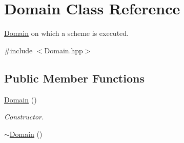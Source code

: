 \hypertarget{classDomain}{
\section{Domain Class Reference}
\label{classDomain}
}


\hyperlink{classDomain}{Domain} on which a scheme is executed.  


{\ttfamily \#include $<$Domain.hpp$>$}\subsection*{Public Member Functions}
\begin{DoxyCompactItemize}
\item 
\hypertarget{classDomain_a6adccae537e53d4fde2b70f875e6b8d0}{
\hyperlink{classDomain_a6adccae537e53d4fde2b70f875e6b8d0}{Domain} ()}
\label{classDomain_a6adccae537e53d4fde2b70f875e6b8d0}

\begin{DoxyCompactList}\small\item\em Constructor. \item\end{DoxyCompactList}\item 
\hypertarget{classDomain_a29cec9afb2e54c810ba1f3c1a49543a8}{
\hyperlink{classDomain_a29cec9afb2e54c810ba1f3c1a49543a8}{$\sim$Domain} ()}
\label{classDomain_a29cec9afb2e54c810ba1f3c1a49543a8}


\end{DoxyCompactItemize}
